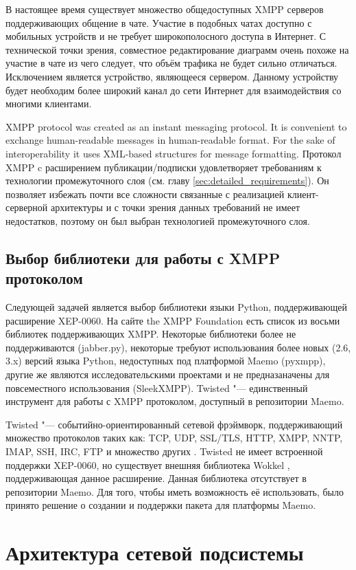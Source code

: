 В настоящее время существует множество общедоступных XMPP серверов
поддерживающих общение в чате. Участие в подобных чатах доступно с мобильных
устройств и не требует широкополосного доступа в Интернет. С технической точки
зрения, совместное редактирование диаграмм очень похоже на участие в чате из
чего следует, что объём трафика не будет сильно отличаться. Исключением является
устройство, являющееся сервером. Данному устройству будет необходим более
широкий канал до сети Интернет для взаимодействия со многими клиентами.

XMPP protocol was created as an instant messaging protocol. It is convenient to
exchange human-readable messages in human-readable format. For the sake of
interoperability it uses XML-based structures for message formatting. Протокол
XMPP c расширением публикации/подписки удовлетворяет требованиям к технологии
промежуточного слоя (см. главу \ref{sec:detailed_requirements}). Он позволяет
избежать почти все сложности связанные с реализацией клиент-серверной
архитектуры и с точки зрения данных требований не имеет недостатков, поэтому он
был выбран технологией промежуточного слоя.

\subsection{Выбор библиотеки для работы с XMPP протоколом}
Следующей задачей является выбор библиотеки языки Python, поддерживающей
расширение XEP-0060. На сайте the XMPP Foundation \cite{xmpp} есть список из
восьми библиотек поддерживающих XMPP. Некоторые библиотеки более не
поддерживаются (jabber.py), некоторые требуют использования более новых (2.6,
3.x) версий языка Python, недоступных под платформой Maemo (pyxmpp), другие же
являются исследовательскими проектами и не предназаначены для повсеместного
использования (SleekXMPP). Twisted "--- единственный инструмент для работы с
XMPP протоколом, доступный в репозитории Maemo.

Twisted "--- событийно-ориентированный сетевой фрэймворк, поддерживающий
множество протоколов таких как: TCP, UDP, SSL/TLS, HTTP, XMPP, NNTP, IMAP, SSH,
IRC, FTP и множество других \cite{twisted}. Twisted не имеет встроенной
поддержки XEP-0060, но существует внешняя библиотека Wokkel \cite{wokkel},
поддерживающая данное расширение. Данная библиотека отсутствует в репозитории
Maemo. Для того, чтобы иметь возможность её использовать, было принято решение о
создании и поддержки пакета для платформы Maemo.

\section{Архитектура сетевой подсистемы}
